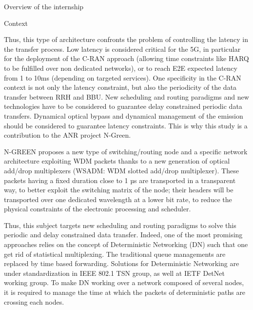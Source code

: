 \documentclass[a4paper,10pt]{report}
\begin{document}
\begin{chapter}{Overview of the internship}
\begin{section}{Context}
\begin{center}

\end{center}


Thus, this type of architecture confronts the problem of controlling 
the latency in the transfer process.  Low latency is considered critical for the 5G, in particular for the deployment of the C-RAN approach 
(allowing time constraints like HARQ to be fulfilled over non dedicated networks), or to reach E2E expected latency from 1 to 10ms 
(depending on targeted services). One specificity in the C-RAN context is not only the latency constraint, but also the periodicity of 
the data transfer between RRH and BBU.  New scheduling and routing paradigms and new technologies have to be considered to  guarantee 
delay constrained periodic data transfers. Dynamical optical bypass and dynamical management of the emission should be considered to
guarantee latency constraints. This is why this study is a contribution to the ANR project N-Green.

N-GREEN proposes a new type of switching/routing node and a specific network architecture exploiting WDM packets thanks to a new generation of optical add/drop multiplexers (WSADM: WDM slotted add/drop multiplexer). These packets having a fixed duration close to 1 µs are transported in a transparent way, to better exploit the switching matrix of the node; their headers will be transported over one dedicated wavelength at a lower bit rate, to reduce the physical constraints of the electronic processing and scheduler.

 Thus, this subject targets new scheduling and routing paradigms to solve this periodic and delay constrained data transfer.
 Indeed, one of the most promising approaches relies on the concept of Deterministic Networking (DN) such that one get rid of
 statistical multiplexing. The traditional queue managements are replaced by time based forwarding. Solutions for Deterministic 
 Networking are under standardization in IEEE 802.1 TSN group, as well at IETF DetNet working group.  To make DN working over a
 network composed of several nodes, it is required to manage the time at which the packets of deterministic paths are crossing each nodes. 


\end{section}
\end{chapter}
\end{document}
